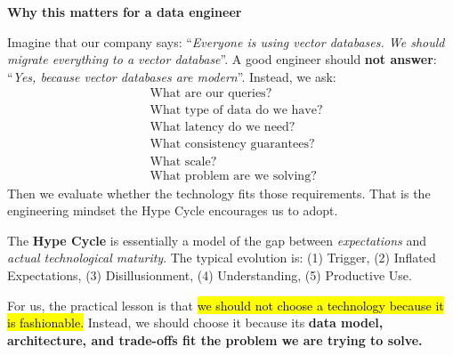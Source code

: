 \highspace
\begin{flushleft}
    \textcolor{Green3}{ \textbf{Why this matters for a data engineer}}
\end{flushleft}
Imagine that our company says: ``\emph{Everyone is using vector databases. We should migrate everything to a vector database}''. A good engineer should \textbf{not answer}: ``\emph{Yes, because vector databases are modern}''. Instead, we ask:
\begin{equation*}
    \begin{aligned}
        &\text{What are our queries?}\\
        &\text{What type of data do we have?}\\
        &\text{What latency do we need?}\\
        &\text{What consistency guarantees?}\\
        &\text{What scale?}\\
        &\text{What problem are we solving?}
    \end{aligned}
\end{equation*}
Then we evaluate whether the technology fits those requirements. That is the engineering mindset the Hype Cycle encourages us to adopt.

\highspace
\begin{takeawaysbox}
    The \textbf{Hype Cycle} is essentially a model of the gap between \emph{expectations} and \emph{actual technological maturity}. The typical evolution is: (1) Trigger, (2) Inflated Expectations, (3) Disillusionment, (4) Understanding, (5) Productive Use.

    For us, the practical lesson is that \hl{we should not choose a technology because it is fashionable.} Instead, we should choose it because its \textbf{data model, architecture, and trade-offs fit the problem we are trying to solve.}
\end{takeawaysbox}
